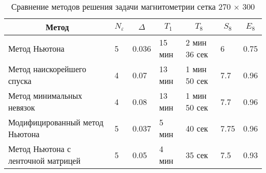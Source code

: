 \begin{table}[]
	\centering
	\renewcommand{\arraystretch}{1.5}
	\caption{Сравнение методов решения задачи магнитометрии сетка 270 $\times$ 300}
	\label{table3.2}
	\begin{tabular}{|p{}|p{}|l|l|l|l|l|}
		\hline
		\multicolumn{1}{|c|}{Метод}        & \multicolumn{1}{c|}{$N_\varepsilon$} &
		\multicolumn{1}{c|}{$\Delta$} &
		\multicolumn{1}{c|}{$T_1$} & \multicolumn{1}{c|}{$T_8$} &	\multicolumn{1}{c|}{$S_8$}&\multicolumn{1}{c|}{$E_8$} \\ \hline
		Метод Ньютона                      &   5             & 0.036                  &     15 мин                   &      2 мин 36 сек   
		& 6 &        0.75     \\ \hline
		Метод наискорейшего спуска &   4                    & 0.07               & 13 мин    & 1 мин 50 сек & 7.7 & 0.96   \\ \hline
		Метод минимальных невязок &   4                    & 0.08               & 13 мин    & 1 мин 50 сек & 7.7 & 0.96   \\ \hline
		Модифицированный метод Ньютона     &              5           & 0.037           & 5 мин                & 40 сек  & 7.75 & 0.96\\ \hline
		Метод Ньютона с ленточной матрицей &   5                    & 0.05               & 4 мин    & 35 сек & 7.5 & 0.93   \\ \hline
	\end{tabular}
\end{table}

